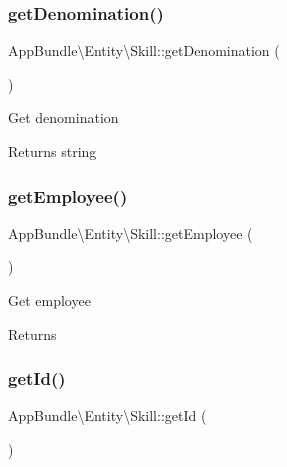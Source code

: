 \subsubsection{\texorpdfstring{get\+Denomination()}{getDenomination()}}
{\footnotesize\ttfamily App\+Bundle\textbackslash{}\+Entity\textbackslash{}\+Skill\+::get\+Denomination (\begin{DoxyParamCaption}{ }\end{DoxyParamCaption})}

Get denomination

\begin{DoxyReturn}{Returns}
string 
\end{DoxyReturn}
\mbox{\label{class_app_bundle_1_1_entity_1_1_skill_a51b3c9c44296f130bd2a988e1f399fc2}} 
\subsubsection{\texorpdfstring{get\+Employee()}{getEmployee()}}
{\footnotesize\ttfamily App\+Bundle\textbackslash{}\+Entity\textbackslash{}\+Skill\+::get\+Employee (\begin{DoxyParamCaption}{ }\end{DoxyParamCaption})}

Get employee

\begin{DoxyReturn}{Returns}

\end{DoxyReturn}
\mbox{\label{class_app_bundle_1_1_entity_1_1_skill_a46db4431c15f4d2a9a7e2a8055cfbd15}} 
\subsubsection{\texorpdfstring{get\+Id()}{getId()}}
{\footnotesize\ttfamily App\+Bundle\textbackslash{}\+Entity\textbackslash{}\+Skill\+::get\+Id (\begin{DoxyParamCaption}{ }\end{DoxyParamCaption})}

